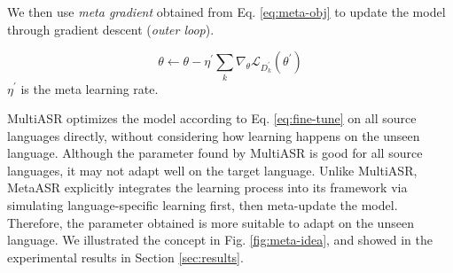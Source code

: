 We then use \textit{meta gradient} obtained from Eq. \ref{eq:meta-obj} to update the model through gradient descent (\textit{outer loop}).

\begin{equation}
  \label{eq:meta-grad}
  \theta \leftarrow \theta - \eta^\prime \sum_k \nabla_\theta \mathcal{L}_{D^\prime_k}(\theta^\prime)
\end{equation}
$\eta^\prime$ is the meta learning rate.

MultiASR optimizes the model according to Eq. \ref{eq:fine-tune} on all source languages directly, without considering how learning happens on the unseen language. Although the parameter found by MultiASR is good for all source languages, it may not adapt well on the target language. Unlike MultiASR, MetaASR explicitly integrates the learning process into its framework via simulating language-specific learning first, then meta-update the model. Therefore, the parameter obtained is more suitable to adapt on the unseen language. We illustrated the concept in Fig. \ref{fig:meta-idea}, and showed in the experimental results in Section \ref{sec:results}.
